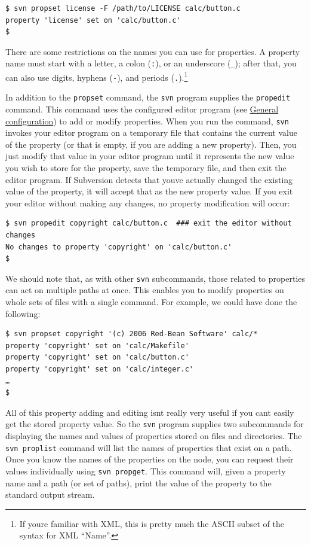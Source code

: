 \begin{verbatim}
$ svn propset license -F /path/to/LICENSE calc/button.c
property 'license' set on 'calc/button.c'
$
\end{verbatim}

There are some restrictions on the names you can use for properties. A
property name must start with a letter, a colon (\texttt{:}), or an
underscore (\texttt{\_}); after that, you can also use digits, hyphens
(\texttt{-}), and periods (\texttt{.}).\footnote{If
  you\textquotesingle re familiar with XML, this is pretty much the
  ASCII subset of the syntax for XML ``Name''.}

In addition to the \texttt{propset} command, the \texttt{svn} program
supplies the \texttt{propedit} command. This command uses the configured
editor program (see \hyperref[svn.advanced.confarea.opts.config]{General
configuration}) to add or modify properties. When you run the command,
\texttt{svn} invokes your editor program on a temporary file that
contains the current value of the property (or that is empty, if you are
adding a new property). Then, you just modify that value in your editor
program until it represents the new value you wish to store for the
property, save the temporary file, and then exit the editor program. If
Subversion detects that you\textquotesingle ve actually changed the
existing value of the property, it will accept that as the new property
value. If you exit your editor without making any changes, no property
modification will occur:

\begin{verbatim}
$ svn propedit copyright calc/button.c  ### exit the editor without changes
No changes to property 'copyright' on 'calc/button.c'
$
\end{verbatim}

We should note that, as with other \texttt{svn} subcommands, those
related to properties can act on multiple paths at once. This enables
you to modify properties on whole sets of files with a single command.
For example, we could have done the following:

\begin{verbatim}
$ svn propset copyright '(c) 2006 Red-Bean Software' calc/*
property 'copyright' set on 'calc/Makefile'
property 'copyright' set on 'calc/button.c'
property 'copyright' set on 'calc/integer.c'
…
$
\end{verbatim}

All of this property adding and editing isn\textquotesingle t really
very useful if you can\textquotesingle t easily get the stored property
value. So the \texttt{svn} program supplies two subcommands for
displaying the names and values of properties stored on files and
directories. The \texttt{svn\ proplist} command will list the names of
properties that exist on a path. Once you know the names of the
properties on the node, you can request their values individually using
\texttt{svn\ propget}. This command will, given a property name and a
path (or set of paths), print the value of the property to the standard
output stream.

